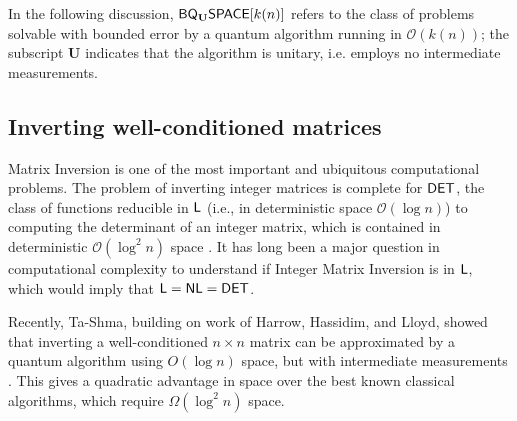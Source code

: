 \documentclass[11pt]{article}
\theoremstyle{definition}
\theoremstyle{remark}
\newcommand\DET{{\sf{DET}}}
\newcommand\Logspace{{\sf{L}}}
\newcommand{\classfont}{\sf}
\newcommand{\Unitary}{\mathbf{U}}
\newcommand{\unitaryBQSPACE}[1]{{\classfont{BQ}_\Unitary\classfont{SPACE}}[#1]}
\newcommand\bigoh{\mathcal{O}}
\begin{document}
In the following discussion, $\unitaryBQSPACE{k(n)}$ refers to the class of problems solvable with bounded error by a quantum algorithm running in $\mathcal{O}(k(n))$; the subscript $\Unitary$ indicates that the algorithm is unitary, i.e. employs no intermediate measurements.
\subsection{Inverting well-conditioned matrices}
Matrix Inversion is one of the most important and ubiquitous computational problems.  The problem of inverting integer matrices is complete for $\DET$, the class of functions reducible in $\Logspace$ (i.e., in deterministic space $\bigoh(\log{n})$) to computing the determinant of an integer matrix, which is contained in deterministic $\bigoh(\log^2{n})$ space \cite{berkowitz, cook}.  It has long been a major question in computational complexity to understand if Integer Matrix Inversion is in $\Logspace$, which would imply that $\Logspace=\sf{NL}=\DET$.

Recently, Ta-Shma, building on work of Harrow, Hassidim, and Lloyd, showed that inverting a well-conditioned $n \times n$ matrix can be approximated by a quantum algorithm using $O(\log n)$ space, but with intermediate measurements \cite{tashma,HHL}. This gives a quadratic advantage in space over the best known classical algorithms, which require $\Omega(\log^2n)$ space.
\end{document}
